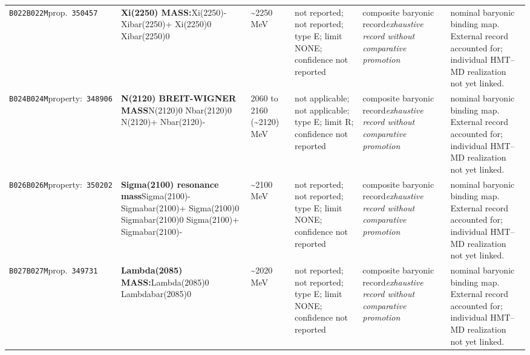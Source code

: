 \begin{landscape}
\begin{longtable}{L{1.85cm}L{4.45cm}L{2.35cm}L{4.05cm}L{3.35cm}L{7.15cm}}
\texttt{B022}\newline \texttt{B022M}\newline prop.\ \texttt{350457} & \textbf{Xi(2250) MASS:}\newline Xi(2250)- \textbar{}\allowbreak{} Xibar(2250)+ \textbar{}\allowbreak{} Xi(2250)0 \textbar{}\allowbreak{} Xibar(2250)0 & \textasciitilde{}2250\,MeV & not reported; not reported; type E; limit NONE; confidence not reported & composite baryonic record\newline \emph{exhaustive record without comparative promotion} & nominal baryonic binding map. External record accounted for; individual HMT--MD realization not yet linked. \\
\texttt{B024}\newline \texttt{B024M}\newline property:\ \texttt{348906} & \textbf{N(2120) BREIT-WIGNER MASS}\newline N(2120)0 \textbar{}\allowbreak{} Nbar(2120)0 \textbar{}\allowbreak{} N(2120)+ \textbar{}\allowbreak{} Nbar(2120)- & 2060 to 2160 (\textasciitilde{}2120)\,MeV & not applicable; not applicable; type E; limit R; confidence not reported & composite baryonic record\newline \emph{exhaustive record without comparative promotion} & nominal baryonic binding map. External record accounted for; individual HMT--MD realization not yet linked. \\
\texttt{B026}\newline \texttt{B026M}\newline property:\ \texttt{350202} & \textbf{Sigma(2100) resonance mass}\newline Sigma(2100)- \textbar{}\allowbreak{} Sigmabar(2100)+ \textbar{}\allowbreak{} Sigma(2100)0 \textbar{}\allowbreak{} Sigmabar(2100)0 \textbar{}\allowbreak{} Sigma(2100)+ \textbar{}\allowbreak{} Sigmabar(2100)- & \textasciitilde{}2100\,MeV & not reported; not reported; type E; limit NONE; confidence not reported & composite baryonic record\newline \emph{exhaustive record without comparative promotion} & nominal baryonic binding map. External record accounted for; individual HMT--MD realization not yet linked. \\
\texttt{B027}\newline \texttt{B027M}\newline prop.\ \texttt{349731} & \textbf{Lambda(2085) MASS:}\newline Lambda(2085)0 \textbar{}\allowbreak{} Lambdabar(2085)0 & \textasciitilde{}2020\,MeV & not reported; not reported; type E; limit NONE; confidence not reported & composite baryonic record\newline \emph{exhaustive record without comparative promotion} & nominal baryonic binding map. External record accounted for; individual HMT--MD realization not yet linked. \\

\end{longtable}
\end{landscape}

